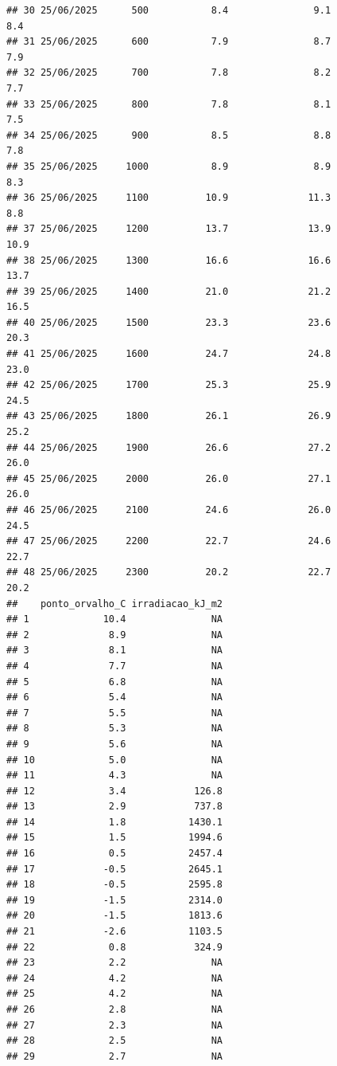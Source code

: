 \documentclass[
]{article}
\begin{document}
\begin{verbatim}
## 30 25/06/2025      500           8.4               9.1               8.4
## 31 25/06/2025      600           7.9               8.7               7.9
## 32 25/06/2025      700           7.8               8.2               7.7
## 33 25/06/2025      800           7.8               8.1               7.5
## 34 25/06/2025      900           8.5               8.8               7.8
## 35 25/06/2025     1000           8.9               8.9               8.3
## 36 25/06/2025     1100          10.9              11.3               8.8
## 37 25/06/2025     1200          13.7              13.9              10.9
## 38 25/06/2025     1300          16.6              16.6              13.7
## 39 25/06/2025     1400          21.0              21.2              16.5
## 40 25/06/2025     1500          23.3              23.6              20.3
## 41 25/06/2025     1600          24.7              24.8              23.0
## 42 25/06/2025     1700          25.3              25.9              24.5
## 43 25/06/2025     1800          26.1              26.9              25.2
## 44 25/06/2025     1900          26.6              27.2              26.0
## 45 25/06/2025     2000          26.0              27.1              26.0
## 46 25/06/2025     2100          24.6              26.0              24.5
## 47 25/06/2025     2200          22.7              24.6              22.7
## 48 25/06/2025     2300          20.2              22.7              20.2
##    ponto_orvalho_C irradiacao_kJ_m2
## 1             10.4               NA
## 2              8.9               NA
## 3              8.1               NA
## 4              7.7               NA
## 5              6.8               NA
## 6              5.4               NA
## 7              5.5               NA
## 8              5.3               NA
## 9              5.6               NA
## 10             5.0               NA
## 11             4.3               NA
## 12             3.4            126.8
## 13             2.9            737.8
## 14             1.8           1430.1
## 15             1.5           1994.6
## 16             0.5           2457.4
## 17            -0.5           2645.1
## 18            -0.5           2595.8
## 19            -1.5           2314.0
## 20            -1.5           1813.6
## 21            -2.6           1103.5
## 22             0.8            324.9
## 23             2.2               NA
## 24             4.2               NA
## 25             4.2               NA
## 26             2.8               NA
## 27             2.3               NA
## 28             2.5               NA
## 29             2.7               NA

\end{verbatim}
\end{document}
